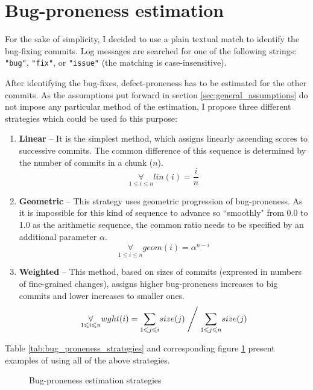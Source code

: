 \documentclass{pracamgr}
\begin{document}

\section{Bug-proneness estimation}
\label{sec:bug-proneness}
For the sake of simplicity, I decided to use a plain textual match to identify the bug-fixing commits. Log messages are searched for one of the following strings: \texttt{"bug"}, \texttt{"fix"}, or \texttt{"issue"} (the matching is case-insensitive).

After identifying the bug-fixes, defect-proneness has to be estimated for the other commits. As the assumptions put forward in section \ref{sec:general_assumptions} do not impose any particular method of the estimation, I propose three different strategies which could be used fo this purpose:
\begin{enumerate}[label=(S\arabic*)]
	\item \textbf{Linear} -- It is the simplest method, which assigns linearly ascending scores to successive commits. The common difference of this sequence is determined by the number of commits in a chunk ($n$).
	\[ \underset{1 \leqslant i \leqslant n}{\forall} lin(i) = \frac{i}{n} \]
	\item \textbf{Geometric} -- This strategy uses geometric progression of bug-proneness. As it is impossible for this kind of sequence to advance so ``smoothly" from 0.0 to 1.0 as the arithmetic sequence, the common ratio needs to be specified by an additional parameter $\alpha$.
	\[ \underset{1 \leqslant i \leqslant n}{\forall} geom(i) = \alpha^{n - i} \]
	\item \textbf{Weighted} -- This method, based on sizes of commits (expressed in numbers of fine-grained changes), assigns higher bug-proneness increases to big commits and lower increases to smaller ones.
	\[ \underset{1 \leqslant i \leqslant n}{\forall} wght(i) =  \underset{1 \leqslant j \leqslant i}{\sum} size(j) \Biggm/ \underset{1 \leqslant j \leqslant n}{\sum} size(j) 	 \]
\end{enumerate}

Table \ref{tab:bug_proneness_strategies} and corresponding figure \ref{fig:bug_proneness_strategies} present examples of using all of the above strategies.


\begin{figure}[h]
\centering

\caption{Bug-proneness estimation strategies}
\label{fig:bug_proneness_strategies}
\end{figure}
\end{document}
